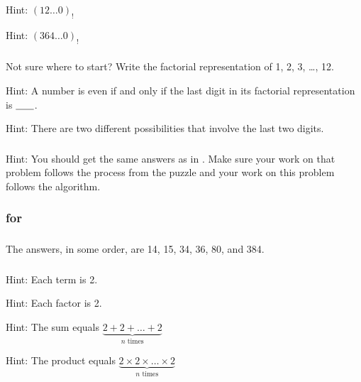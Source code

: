 \subsubsection*{ \answers}
\begin{apart}
    \item Hint: $(12 \ldots 0)_!$
    \item Hint: $(364\ldots 0)_!$
\end{apart}

\subsubsection*{ \answers}
Not sure where to start?  Write the factorial representation of 1, 2, 3, \ldots, 12.
\begin{apart}
    \item Hint: A number is even if and only if the last digit in its factorial representation is $\underline{\hspace{.25in}}$.
    \item Hint: There are two different possibilities that involve the last two digits.
\end{apart}

\subsubsection*{ \answers}
Hint: You should get the same answers as in .  Make sure your work on that problem follows the process from the puzzle and your work on this problem follows the algorithm.

\subsubsection{\answers for  \subsigmapi}

\subsubsection*{ \answers}
The answers, in some order, are 14, 15, 34, 36, 80, and 384.

\subsubsection*{ \answers}
\begin{apart}
    \item Hint: Each term is 2.
    \item Hint: Each factor is 2.
    \item Hint: The sum equals $\underbrace{2+2+\ldots+2}_{n \text{ times}}$
    \item Hint: The product equals $\underbrace{2 \times 2 \times \ldots \times 2}_{n \text{ times}}$
\end{apart}

